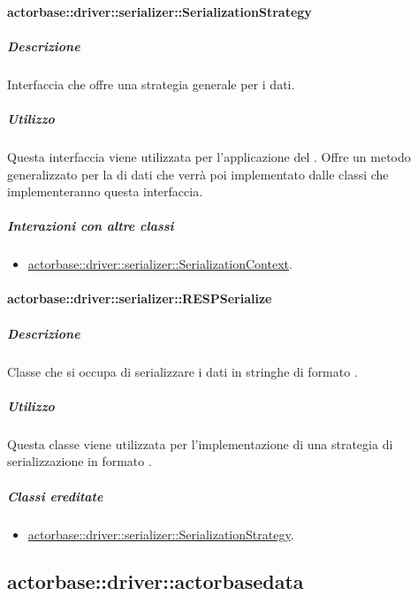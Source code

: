 \documentclass{scalatekids-article}
\begin{document}
\paragraph{actorbase::driver::serializer::SerializationStrategy}
\label{sec:actorbase::driver::serializer::SerializationStrategy}

\subparagraph{Descrizione}

Interfaccia che offre una strategia generale per  i dati.

\subparagraph{Utilizzo}

Questa interfaccia viene utilizzata per l'applicazione del 
. Offre un metodo generalizzato per la
 di dati che verrà poi implementato dalle classi che
implementeranno questa interfaccia.

\subparagraph{Interazioni con altre classi}

\begin{itemize}

\item \hyperref[sec:actorbase::driver::serializer::SerializationContext]{actorbase::driver::serializer::SerializationContext}.

\end{itemize}

\paragraph{actorbase::driver::serializer::RESPSerialize}

\subparagraph{Descrizione}

Classe che si occupa di serializzare i dati in stringhe di formato .

\subparagraph{Utilizzo}

Questa classe viene utilizzata per l'implementazione di una strategia di
serializzazione in formato .

\subparagraph{Classi ereditate}

\begin{itemize}

\item \hyperref[sec:actorbase::driver::serializer::SerializationStrategy]{actorbase::driver::serializer::SerializationStrategy}.

\end{itemize}

\subsection{actorbase::driver::actorbasedata}
\label{sec:actorbase::driver::actorbasedata}
\end{document}
